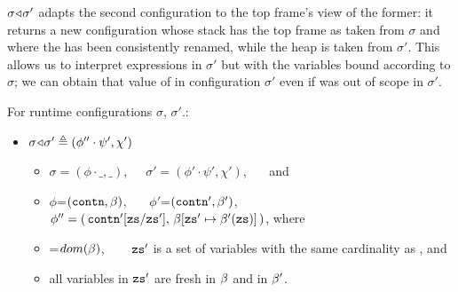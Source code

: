  $\sigma \!\triangleleft\! \sigma'$ adapts the second configuration to the top frame's view of the former: it returns a new configuration whose stack has  the top frame as taken from $\sigma$ and where the  has been consistently renamed, while the heap is taken from $\sigma'$. This allows us to interpret expressions  in   $\sigma'$ but with the variables bound according to   $\sigma$; \eg we can obtain that value of  in configuration  $\sigma'$ even if  was out of scope in $\sigma'$. 
 



 \begin{definition}[Adaptation] %
  \label{def:config:adapt}
 For runtime configurations $\sigma$, $\sigma'$.$:$
 $~ $ 

\begin{itemize}
\item
$\sigma \!\triangleleft\! \sigma' \triangleq (\phi''\cdot\psi',\chi')$  \IFF 
\begin{itemize}
\item
$\sigma=(\phi\cdot\_,\_)$,\ \ \  $\sigma'= (\phi'\cdot\psi',\chi')$, \ \ \ and
\item $\phi$=$({\mbox{\tt{contn}}},{\beta})$, \ \ \  $\phi'$=$({\mbox{\tt{contn}}}',{\beta}')$, \ \ 
  $\phi''=(\, \prg{contn}'[\prg{zs}/\prg{zs}' ],\,\varMap[\prg{zs}'\mapsto \varMap'()]\, ) $, where
\item
=$dom({\beta})$,  \ \  \
${\mbox{\tt{zs}}}'$ is a set  of variables with  the  same cardinality as \prg{zs}, and
\item  all variables in
${\mbox{\tt{zs}}}'$  are fresh in ${\beta}$ and in ${\beta}'$.
\end{itemize}
\end{itemize}
\end{definition}

